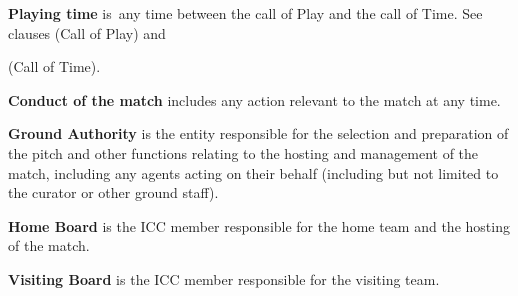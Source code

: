 \documentclass[12pt]{article}
\begin{document}
\vspace{\baselineskip}
{\fontsize{9pt}{10.8pt} \tabto{0.39in} {\fontsize{8pt}{9.6pt}\selectfont \textbf{Playing time }is\ any time between the call of Play and the call of Time.  See clauses (Call of Play) and\par}\par}\par


\vspace{\baselineskip}
\begin{adjustwidth}{0.4in}{0.0in}
{\fontsize{9pt}{10.8pt}\selectfont (Call of Time).\par}\par

\end{adjustwidth}


\vspace{\baselineskip}
{\fontsize{9pt}{10.8pt} \tabto{0.39in} {\fontsize{8pt}{9.6pt}\selectfont \textbf{Conduct of the match }includes any action relevant to the match at any time.\par}\par}\par


\vspace{\baselineskip}
\begin{adjustwidth}{0.4in}{0.14in}
{\fontsize{9pt}{10.8pt} \tabto{0.39in} \textbf{Ground Authority }is the entity responsible for the selection and preparation of the pitch and other functions\textbf{ }relating to the hosting and management of the match, including any agents acting on their behalf (including but not limited to the curator or other ground staff).\par}\par

\end{adjustwidth}


\vspace{\baselineskip}
{\fontsize{9pt}{10.8pt} \tabto{0.39in} {\fontsize{8pt}{9.6pt}\selectfont \textbf{Home Board }is the ICC member responsible for the home team and the hosting of the match.\par}\par}\par


\vspace{\baselineskip}
{\fontsize{9pt}{10.8pt} \tabto{0.39in} {\fontsize{8pt}{9.6pt}\selectfont \textbf{Visiting Board }is the ICC member responsible for the visiting team.\par}\par}\par
\end{document}
